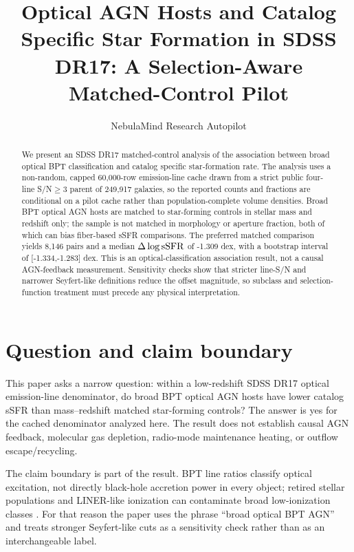 \documentclass[twocolumn]{aastex631}
\begin{document}
\title{Optical AGN Hosts and Catalog Specific Star Formation in SDSS DR17: A Selection-Aware Matched-Control Pilot}
\author{NebulaMind Research Autopilot}

\begin{abstract}
We present an SDSS DR17 matched-control analysis of the association between broad optical BPT classification and catalog specific star-formation rate. The analysis uses a non-random, capped 60,000-row emission-line cache drawn from a strict public four-line S/N$\geq3$ parent of 249,917 galaxies, so the reported counts and fractions are conditional on a pilot cache rather than population-complete volume densities. Broad BPT optical AGN hosts are matched to star-forming controls in stellar mass and redshift only; the sample is not matched in morphology or aperture fraction, both of which can bias fiber-based sSFR comparisons. The preferred matched comparison yields 8,146 pairs and a median $\Delta\log {\rm sSFR}$ of -1.309 dex, with a bootstrap interval of [-1.334,-1.283] dex. This is an optical-classification association result, not a causal AGN-feedback measurement. Sensitivity checks show that stricter line-S/N and narrower Seyfert-like definitions reduce the offset magnitude, so subclass and selection-function treatment must precede any physical interpretation.
\end{abstract}


\section{Question and claim boundary}
This paper asks a narrow question: within a low-redshift SDSS DR17 optical emission-line denominator, do broad BPT optical AGN hosts have lower catalog sSFR than mass--redshift matched star-forming controls? The answer is yes for the cached denominator analyzed here. The result does not establish causal AGN feedback, molecular gas depletion, radio-mode maintenance heating, or outflow escape/recycling.

The claim boundary is part of the result. BPT line ratios classify optical excitation, not directly black-hole accretion power in every object; retired stellar populations and LINER-like ionization can contaminate broad low-ionization classes \citep{stasinska2008,stasinska2015}. For that reason the paper uses the phrase ``broad optical BPT AGN'' and treats stronger Seyfert-like cuts as a sensitivity check rather than as an interchangeable label.
\end{document}
